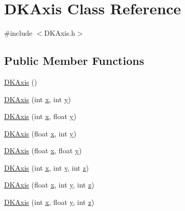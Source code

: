 \hypertarget{class_d_k_axis}{\section{D\-K\-Axis Class Reference}
\label{class_d_k_axis}
}


{\ttfamily \#include $<$D\-K\-Axis.\-h$>$}

\subsection*{Public Member Functions}
\begin{DoxyCompactItemize}
\item 
\hyperlink{class_d_k_axis_a7e2e66b0ef76cd07ddebeb242904eb9e}{D\-K\-Axis} ()
\item 
\hyperlink{class_d_k_axis_a13706176e3b92c606af11645b7944d73}{D\-K\-Axis} (int \hyperlink{class_d_k_axis_aa556f91d172d4ec529e0e406653e5153}{x}, int \hyperlink{class_d_k_axis_a6f98579f8d88002e8b147dc311c214cf}{y})
\item 
\hyperlink{class_d_k_axis_a5fb19138e9ef2464a278be8117533a2c}{D\-K\-Axis} (int \hyperlink{class_d_k_axis_aa556f91d172d4ec529e0e406653e5153}{x}, float \hyperlink{class_d_k_axis_a6f98579f8d88002e8b147dc311c214cf}{y})
\item 
\hyperlink{class_d_k_axis_a18a60588c2663e8ca224c9d61caddc97}{D\-K\-Axis} (float \hyperlink{class_d_k_axis_aa556f91d172d4ec529e0e406653e5153}{x}, int \hyperlink{class_d_k_axis_a6f98579f8d88002e8b147dc311c214cf}{y})
\item 
\hyperlink{class_d_k_axis_ae88bcdab17f8039c5953c31e9182b55a}{D\-K\-Axis} (float \hyperlink{class_d_k_axis_aa556f91d172d4ec529e0e406653e5153}{x}, float \hyperlink{class_d_k_axis_a6f98579f8d88002e8b147dc311c214cf}{y})
\item 
\hyperlink{class_d_k_axis_a3c829016d409e3cf59315e886eef5088}{D\-K\-Axis} (int \hyperlink{class_d_k_axis_aa556f91d172d4ec529e0e406653e5153}{x}, int \hyperlink{class_d_k_axis_a6f98579f8d88002e8b147dc311c214cf}{y}, int \hyperlink{class_d_k_axis_af81f9ed2d211deb70374977c989326c9}{z})
\item 
\hyperlink{class_d_k_axis_a807f699622ade6b3f91d983999f5f2b5}{D\-K\-Axis} (float \hyperlink{class_d_k_axis_aa556f91d172d4ec529e0e406653e5153}{x}, int \hyperlink{class_d_k_axis_a6f98579f8d88002e8b147dc311c214cf}{y}, int \hyperlink{class_d_k_axis_af81f9ed2d211deb70374977c989326c9}{z})
\item 
\hyperlink{class_d_k_axis_a279845006cb4d369a88653e099972740}{D\-K\-Axis} (int \hyperlink{class_d_k_axis_aa556f91d172d4ec529e0e406653e5153}{x}, float \hyperlink{class_d_k_axis_a6f98579f8d88002e8b147dc311c214cf}{y}, int \hyperlink{class_d_k_axis_af81f9ed2d211deb70374977c989326c9}{z})

\end{DoxyCompactItemize}

